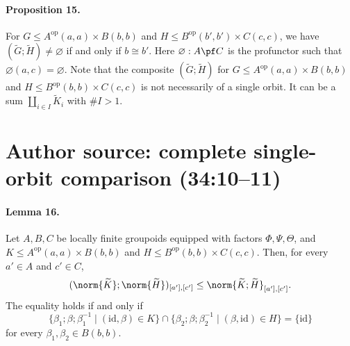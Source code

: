 \paragraph{Proposition 15.} For $G\le A^{\mathrm{op}}(a,a)\times B(b,b)$ and $H\le B^{\mathrm{op}}(b',b')\times C(c,c)$, we have $(\widetilde G;\widetilde H)\ne\varnothing$ if and only if $b\cong b'$. Here $\varnothing:A\pf C$ is the profunctor such that $\varnothing(a,c)=\varnothing$.
Note that the composite $(\widetilde G;\widetilde H)$ for $G\le A^{\mathrm{op}}(a,a)\times B(b,b)$ and $H\le B^{\mathrm{op}}(b,b)\times C(c,c)$ is not necessarily of a single orbit. It can be a sum $\coprod_{i\in I}\widetilde K_i$ with $\#I>1$.
\section*{Author source: complete single-orbit comparison (34:10--11)}
\paragraph{Lemma 16.} Let $A,B,C$ be locally finite groupoids equipped with factors $\Phi,\Psi,\Theta$, and $K\le A^{\mathrm{op}}(a,a)\times B(b,b)$ and $H\le B^{\mathrm{op}}(b,b)\times C(c,c)$. Then, for every $a'\in A$ and $c'\in C$,
\[
(\norm{\widetilde K};\norm{\widetilde H})_{[a'],[c']}\le
\norm{\widetilde K;\widetilde H}_{[a'],[c']}.
\]
The equality holds if and only if
\[
\{\beta_1;\beta;\beta_1^{-1}\mid(\mathrm{id},\beta)\in K\}
\cap\{\beta_2;\beta;\beta_2^{-1}\mid(\beta,\mathrm{id})\in H\}
=\{\mathrm{id}\}
\]
for every $\beta_1,\beta_2\in B(b,b)$.

